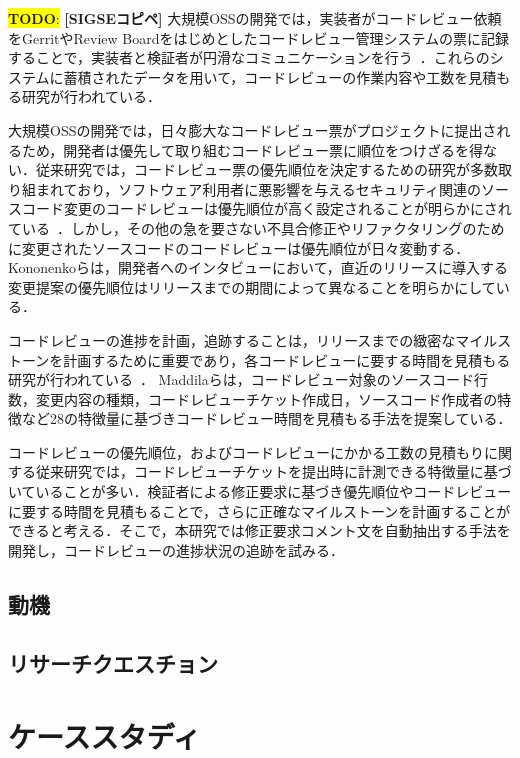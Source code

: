 \documentclass[11pt]{jreport}
\newcommand{\todo}[1]{\colorbox{yellow}{{\bf TODO}:}{\color{red} {\textbf{[#1]}}}}
\begin{document}
\todo{SIGSEコピペ}
大規模OSSの開発では，実装者がコードレビュー依頼をGerritやReview Boardをはじめとしたコードレビュー管理システムの票に記録することで，実装者と検証者が円滑なコミュニケーションを行う~\cite{code_review}．これらのシステムに蓄積されたデータを用いて，コードレビューの作業内容や工数を見積もる研究が行われている．

大規模OSSの開発では，日々膨大なコードレビュー票がプロジェクトに提出されるため，開発者は優先して取り組むコードレビュー票に順位をつけざるを得ない．従来研究では，コードレビュー票の優先順位を決定するための研究が多数取り組まれており，ソフトウェア利用者に悪影響を与えるセキュリティ関連のソースコード変更のコードレビューは優先順位が高く設定されることが明らかにされている~\cite{integrator}\cite{review_prioritize_pineapple}．しかし，その他の急を要さない不具合修正やリファクタリングのために変更されたソースコードのコードレビューは優先順位が日々変動する．Kononenkoらは，開発者へのインタビューにおいて，直近のリリースに導入する変更提案の優先順位はリリースまでの期間によって異なることを明らかにしている\cite{release_merge}．

コードレビューの進捗を計画，追跡することは，リリースまでの緻密なマイルストーンを計画するために重要であり，各コードレビューに要する時間を見積もる研究が行われている~\cite{estimate_time1}\cite{estimate_time2}\cite{estimate_time3}\cite{estimate_time4}\cite{estimate_time5}．
Maddilaらは，コードレビュー対象のソースコード行数，変更内容の種類，コードレビューチケット作成日，ソースコード作成者の特徴など28の特徴量に基づきコードレビュー時間を見積もる手法を提案している\cite{estimate_time2}．

コードレビューの優先順位，およびコードレビューにかかる工数の見積もりに関する従来研究では，コードレビューチケットを提出時に計測できる特徴量に基づいていることが多い．検証者による修正要求に基づき優先順位やコードレビューに要する時間を見積もることで，さらに正確なマイルストーンを計画することができると考える．そこで，本研究では修正要求コメント文を自動抽出する手法を開発し，コードレビューの進捗状況の追跡を試みる．
\section{動機}
\section{リサーチクエスチョン}

\chapter{ケーススタディ}
\end{document}
